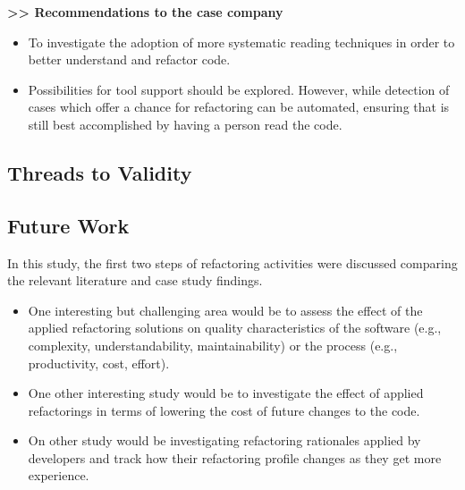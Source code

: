 \textbf{>> Recommendations to the case company}
\begin{itemize}
\item To investigate the adoption of more systematic reading techniques \cite{basiliCodeReading,porterCodeReading} in order to better understand and refactor code.
\item Possibilities for tool support should be explored. However, while detection of cases which offer a chance for refactoring can be automated, ensuring that is still best accomplished by having a person read the code.

\end{itemize}

\subsection{Threads to Validity} \label{validity}
\subsection{Future Work} \label{future}
In this study, the first two steps of refactoring activities were discussed comparing the relevant literature and case study findings. 
\begin{itemize}
\item One interesting but challenging area would be to assess the effect of the applied refactoring solutions on quality characteristics of the software (e.g., complexity, understandability, maintainability) or the process (e.g., productivity, cost, effort).
\item One other interesting study would be to investigate the effect of applied refactorings in terms of lowering the cost of future changes to the code.
\item On other study would be investigating refactoring rationales applied by developers and track how their refactoring profile changes as they get more experience.
\end{itemize}
